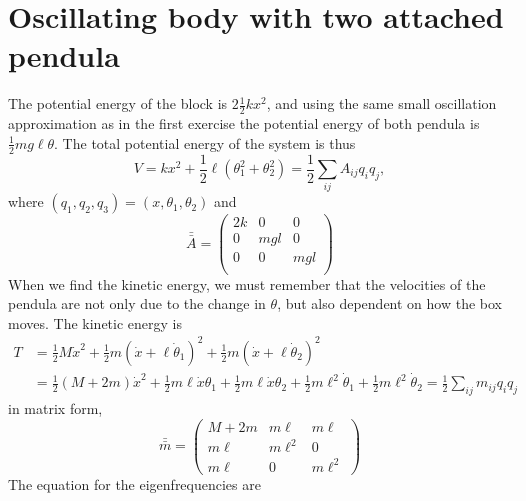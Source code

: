 \documentclass{article}
\begin{document}
    \section{Oscillating body with two attached pendula}
        The potential energy of the block is $2\frac{1}{2}k x^2$, and using the same small oscillation approximation as in the first exercise the potential energy of both pendula is $\frac{1}{2}mg\ell \theta$. The total potential energy of the system is thus
        \begin{equation*}
            V = kx^2 + \frac{1}{2}\ell(\theta_1^2 + \theta_2^2) = \frac{1}{2} \sum_{ij} A_{ij} q_i q_j, 
        \end{equation*}
        where $(q_1, q_2, q_3) = (x, \theta_1, \theta_2)$ and
        \begin{equation*}
            \bar {\bar A} =
            \begin{pmatrix*}
                2k & 0 & 0 \\
                0 & mgl & 0 \\
                0 & 0 & mgl \\
            \end{pmatrix*}
        \end{equation*}
        When we find the kinetic energy, we must remember that the velocities of the pendula are not only due to the change in $\theta$, but also dependent on how the box moves. The kinetic energy is
        \begin{align*}
            T &= \frac{1}{2} M \dot x^2 + \frac{1}{2}m (\dot x + \ell \dot \theta_1)^2 + \frac{1}{2}m (\dot x + \ell \dot \theta_2)^2\\
            &= \frac{1}{2} (M + 2m) \dot x^2 + \frac{1}{2} m \ell \dot x \theta_1 + \frac{1}{2} m \ell \dot x \theta_2 + \frac{1}{2}m\ell^2\dot \theta_1 + \frac{1}{2}m\ell^2\dot \theta_2 = \frac{1}{2}\sum_{ij}m_{ij}q_iq_j
        \end{align*}
        in matrix form, 
        \begin{equation*}
            \bar {\bar m} = 
            \begin{pmatrix*}
                M + 2m & m\ell & m \ell \\
                m\ell & m\ell^2 & 0 \\
                m\ell & 0 & m\ell^2
            \end{pmatrix*}
        \end{equation*}
        The equation for the eigenfrequencies are 
\end{document}
